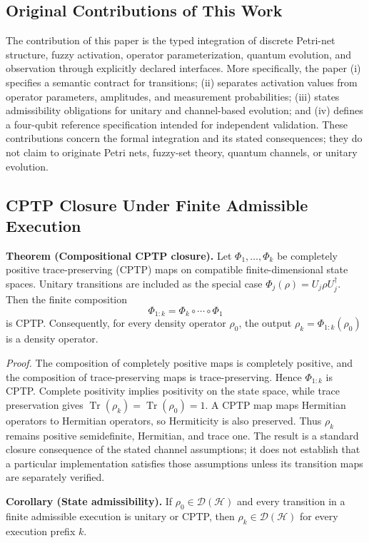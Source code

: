 \documentclass[final,3p,times]{elsarticle}
\begin{document}
\subsection{Original Contributions of This Work}
The contribution of this paper is the typed integration of discrete Petri-net structure, fuzzy activation, operator parameterization, quantum evolution, and observation through explicitly declared interfaces. More specifically, the paper (i) specifies a semantic contract for transitions; (ii) separates activation values from operator parameters, amplitudes, and measurement probabilities; (iii) states admissibility obligations for unitary and channel-based evolution; and (iv) defines a four-qubit reference specification intended for independent validation. These contributions concern the formal integration and its stated consequences; they do not claim to originate Petri nets, fuzzy-set theory, quantum channels, or unitary evolution.

\subsection{CPTP Closure Under Finite Admissible Execution}\label{sec:cptp-closure}
\textbf{Theorem (Compositional CPTP closure).} Let $\Phi_1,\ldots,\Phi_k$ be completely positive trace-preserving (CPTP) maps on compatible finite-dimensional state spaces. Unitary transitions are included as the special case $\Phi_j(\rho)=U_j\rho U_j^\dagger$. Then the finite composition
\begin{equation}
  \Phi_{1:k}=\Phi_k\circ\cdots\circ\Phi_1
\end{equation}
is CPTP. Consequently, for every density operator $\rho_0$, the output $\rho_k=\Phi_{1:k}(\rho_0)$ is a density operator.

\textit{Proof.} The composition of completely positive maps is completely positive, and the composition of trace-preserving maps is trace-preserving. Hence $\Phi_{1:k}$ is CPTP. Complete positivity implies positivity on the state space, while trace preservation gives $\operatorname{Tr}(\rho_k)=\operatorname{Tr}(\rho_0)=1$. A CPTP map maps Hermitian operators to Hermitian operators, so Hermiticity is also preserved. Thus $\rho_k$ remains positive semidefinite, Hermitian, and trace one. The result is a standard closure consequence of the stated channel assumptions; it does not establish that a particular implementation satisfies those assumptions unless its transition maps are separately verified.

\textbf{Corollary (State admissibility).} If $\rho_0\in\mathcal{D}(\mathcal{H})$ and every transition in a finite admissible execution is unitary or CPTP, then $\rho_k\in\mathcal{D}(\mathcal{H})$ for every execution prefix $k$.
\end{document}
